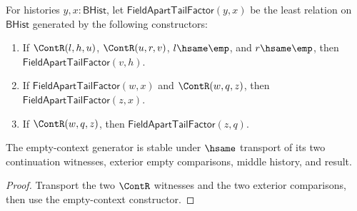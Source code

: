 \begin{definition}
\label{def:field-apartzero-tail-factor-spine}
For histories $y,x:\mathsf{BHist}$, let
$\mathsf{FieldApartTailFactor}(y,x)$ be the least relation on
$\mathsf{BHist}$ generated by the following constructors:
\begin{enumerate}
\item If $\ContR(l,h,u)$, $\ContR(u,r,v)$, $l\hsame\emp$, and
$r\hsame\emp$, then $\mathsf{FieldApartTailFactor}(v,h)$.
\item If $\mathsf{FieldApartTailFactor}(w,x)$ and $\ContR(w,q,z)$, then
$\mathsf{FieldApartTailFactor}(z,x)$.
\item If $\ContR(w,q,z)$, then $\mathsf{FieldApartTailFactor}(z,q)$.
\end{enumerate}
\end{definition}
\begin{lemma}
\label{lem:field-aparttailfactor-empty-context-hsame-transport}
The empty-context generator is stable under $\hsame$ transport of its two
continuation witnesses, exterior empty comparisons, middle history, and result.
\end{lemma}
\begin{proof}
Transport the two $\ContR$ witnesses and the two exterior comparisons, then use the empty-context constructor.
\end{proof}

